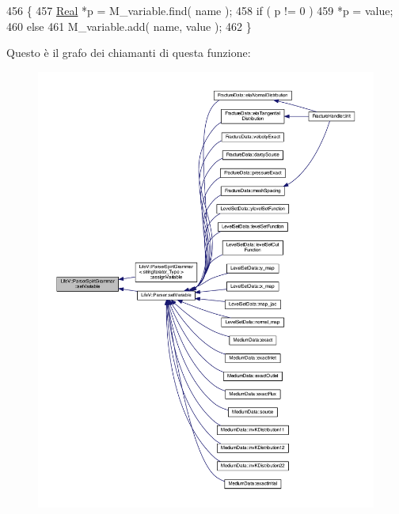 \begin{DoxyCode}
456 \{
457     \hyperlink{namespaceLifeV_ad58c7402b26e5087b634b25d029c9c32}{Real} *p = M\_variable.find( name );
458     \textcolor{keywordflow}{if} ( p != 0 )
459         *p = value;
460     \textcolor{keywordflow}{else}
461         M\_variable.add( name, value );
462 \}
\end{DoxyCode}


Questo è il grafo dei chiamanti di questa funzione\-:\nopagebreak
\begin{figure}[H]
\begin{center}
\leavevmode
\includegraphics[width=350pt]{classLifeV_1_1ParserSpiritGrammar_a357a7e8d98940858ac6e05c106082e2e_icgraph}
\end{center}
\end{figure}


